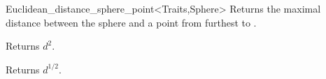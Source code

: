 \begin{ccRefClass}{Euclidean_distance_sphere_point<Traits,Sphere>}
{Returns the maximal distance between the sphere  and
a point from  furthest to . }

 {Returns $d^2$.}

 {Returns $d^{1/2}$.}


\ccSeeAlso




\end{ccRefClass}


